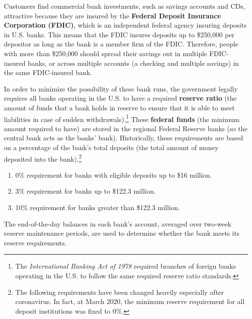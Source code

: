 \documentclass{article}
\begin{document}
    \begin{definition}
      Customers find commercial bank investments, such as savings accounts and CDs, attractive because they are insured by the \textbf{Federal Deposit Insurance Corporation (FDIC)}, which is an independent federal agency insuring deposits in U.S. banks. This means that the FDIC insures deposits up to \$250,000 per depositor as long as the bank is a member firm of the FDIC. Therefore, people with more than \$250,000 should spread their savings out in multiple FDIC-insured banks, or across multiple accounts (a checking and multiple savings) in the same FDIC-insured bank. 
    \end{definition}

    In order to minimize the possibility of these bank runs, the government legally requires all banks operating in the U.S. to have a required \textbf{reserve ratio} (the amount of funds that a bank holds in reserve to ensure that it is able to meet liabilities in case of sudden withdrawals).\footnote{The \textit{International Banking Act of 1978} required branches of foreign banks operating in the U.S. to follow the same required reserve ratio standards.} These \textbf{federal funds} (the minimum amount required to have) are stored in the regional Federal Reserve banks (so the central bank acts as the banks' bank). Historically, these requirements are based on a percentage of the bank's total deposits (the total amount of money deposited into the bank).\footnote{The following requirements have been changed heavily especially after coronavirus. In fact, at March 2020, the minimum reserve requirement for all deposit institutions was fixed to 0\%.} 
    \begin{enumerate}
      \item 0\% requirement for banks with eligible deposits up to \$16 million. 
      \item 3\% requirement for banks up to \$122.3 million. 
      \item 10\% requirement for banks greater than \$122.3 million. 
    \end{enumerate}
    The end-of-the-day balances in each bank's account, averaged over two-week reserve maintenance periods, are used to determine whether the bank meets its reserve requirements. 
\end{document}
